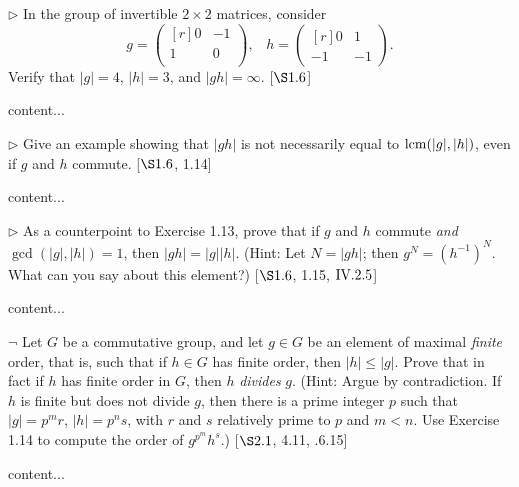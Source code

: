 \begin{exercise}
	$\triangleright$ In the group of invertible $2\times 2$ matrices, consider
	\[
		g = 
		\begin{pmatrix*}[r]
			0 & -1\\
			1 & 0\\
		\end{pmatrix*},
		\; \; \;
		h= 
		\begin{pmatrix*}[r]
			0 & 1 \\
			-1 & -1
		\end{pmatrix*}.
	\]
	Verify that $|g| = 4$, $|h| = 3$, and $|gh| = \infty$. [$\S 1.6$]
\end{exercise}
\begin{solution}
	content...
\end{solution}

\begin{exercise}
	$\triangleright$ Give an example showing that $|gh|$ is not necessarily equal to $\operatorname{lcm}(|g|,|h|)$, even if $g$ and $h$ commute. [$\S 1.6$, 1.14]
\end{exercise}
\begin{solution}
	content...
\end{solution}

\begin{exercise}
	$\triangleright$ As a counterpoint to Exercise 1.13, prove that if $g$ and $h$ commute \emph{and} $\gcd(|g|,|h|) = 1$, then $|gh| = |g||h|$. (Hint: Let $N=|gh|$; then $g^N = (h^{-1})^N$. What can you say about this element?) [$\S 1.6$, 1.15, $\RNo{4}.2.5$]
\end{exercise}
\begin{solution}
	content...
\end{solution}

\begin{exercise}
	$\neg$ Let $G$ be a commutative group, and let $g\in G$ be an element of maximal \emph{finite} order, that is, such that if $h\in G$ has finite order, then $|h|\leq |g|$. Prove that in fact if $h$ has finite order in $G$, then $h$ \emph{divides} $g$. (Hint: Argue by contradiction. If $h$ is finite but does not divide $g$, then there is a prime integer $p$ such that $|g| = p^mr$, $|h| = p^ns$, with $r$ and $s$ relatively prime to $p$ and $m < n$. Use Exercise 1.14 to compute the order of $g^{p^{m}}h^s$.) [$\S 2.1$, 4.11, .6.15]
\end{exercise}
\begin{solution}
	content...
\end{solution}



